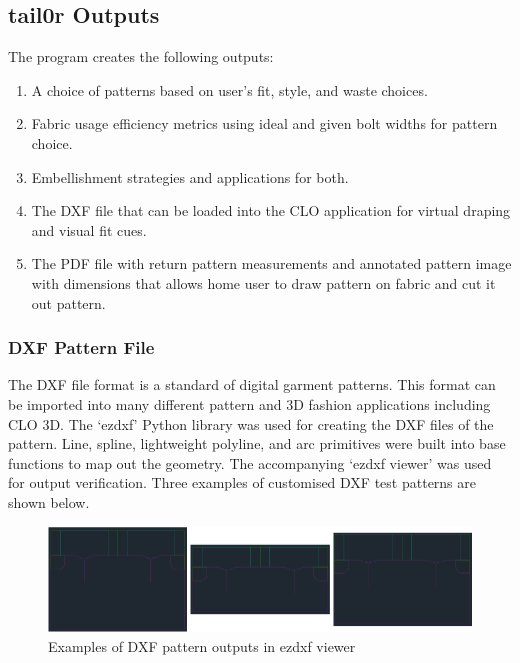 
\subsection{tail0r Outputs}
The program creates the following outputs:
\begin{enumerate}
    \item A choice of patterns based on user's fit, style, and waste choices.
    \item Fabric usage efficiency metrics using ideal and given bolt widths for pattern choice.
    \item Embellishment strategies and applications for both.
    \item The DXF file that can be loaded into the CLO application for virtual draping and visual fit cues.
    \item The PDF file with return pattern measurements and annotated pattern image with dimensions that allows home user to draw pattern on fabric and cut it out pattern.
\end{enumerate}

\subsubsection{DXF Pattern File}
The DXF file format is a standard of digital garment patterns. This format can be imported into many different pattern and 3D fashion applications including CLO 3D. The ‘ezdxf’ Python library was used for creating the DXF files of the pattern. Line, spline, lightweight polyline, and arc primitives were built into base functions to map out the geometry. The accompanying ‘ezdxf viewer’ was used for output verification. Three examples of customised DXF test patterns are shown below.

\begin{figure} [H] %
    \centering %
    \includegraphics[width = \textwidth]{Images/example dxfs.png} %
    \caption{Examples of DXF pattern outputs in ezdxf viewer}
\end{figure}


